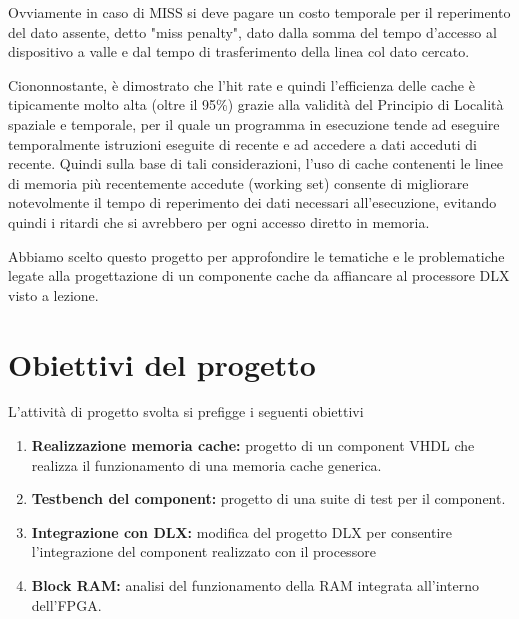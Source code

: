 Ovviamente in caso di MISS si deve pagare un costo temporale per il reperimento del dato assente, detto "miss penalty", dato dalla somma del tempo d'accesso al dispositivo a valle e dal tempo di trasferimento della linea col dato cercato.

Ciononnostante, \`e dimostrato che l'hit rate e quindi l'efficienza delle cache \`e tipicamente molto alta (oltre il 95\%) grazie alla validit\`a del Principio di Localit\`a spaziale e temporale, per il quale un programma in esecuzione tende ad eseguire temporalmente istruzioni eseguite di recente e ad accedere a dati acceduti di recente.
Quindi sulla base di tali considerazioni, l'uso di cache contenenti le linee di memoria pi\`u recentemente accedute (working set) consente di migliorare notevolmente il tempo di reperimento dei dati necessari all'esecuzione, evitando quindi i ritardi che si avrebbero per ogni accesso diretto in memoria.

Abbiamo scelto questo progetto per approfondire le tematiche e le problematiche legate alla progettazione di un componente cache da affiancare al processore DLX visto a lezione.

\section{Obiettivi del progetto}
L'attivit\`a di progetto svolta si prefigge i seguenti obiettivi

\begin{enumerate}

\item \textbf{Realizzazione memoria cache:} progetto di un component VHDL che realizza il funzionamento di una memoria cache generica.

\item \textbf{Testbench del component:} progetto di una suite di test per il component.

\item \textbf{Integrazione con DLX:} modifica del progetto DLX per consentire l'integrazione del component realizzato con il processore

\item \textbf{Block RAM:} analisi del funzionamento della RAM integrata all'interno dell'FPGA.

\end{enumerate}